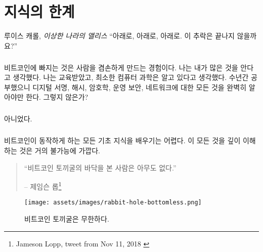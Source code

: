 \chapter{지식의 한계}
\label{les:7}

\begin{chapquote}{루이스 캐롤, \textit{이상한 나라의 앨리스}}
	\enquote{아래로, 아래로, 아래로. 이 추락은 끝나지 않을까요?}
\end{chapquote}

\paragraph{}
비트코인에 빠지는 것은 사람을 겸손하게 만드는 경험이다. 
나는 내가 많은 것을 안다고 생각했다. 
나는 교육받았고, 최소한 컴퓨터 과학은 알고 있다고 생각했다. 
수년간 공부했으니 디지털 서명, 해시, 암호학, 운영 보안, 네트워크에 대한 모든 것을 완벽히 알아야만 한다. 그렇지 않은가?

\paragraph{}
아니었다.

\paragraph{}
비트코인이 동작하게 하는 모든 기초 지식을 배우기는 어렵다. 
이 모든 것을 깊이 이해하는 것은 거의 불가능에 가깝다.

\begin{quotation}\begin{samepage}
		\enquote{비트코인 토끼굴의 바닥을 본 사람은 아무도 없다.}
		\begin{flushright} -- 제임슨 롭\footnote{Jameson Lopp, tweet from Nov 11, 2018 \cite{lopp-tweet}}
\end{flushright}\end{samepage}\end{quotation}

\begin{figure}
	\centering
	\texttt{[image: assets/images/rabbit-hole-bottomless.png]}
	\caption{비트코인 토끼굴은 무한하다.}
	\label{fig:rabbit-hole-bottomless}
\end{figure}


